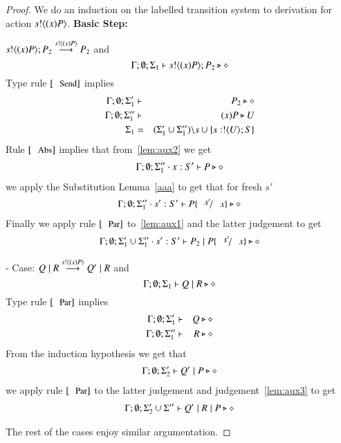 \begin{proof}

	\noi We do an induction on the labelled transition system
	to derivation for action $s ! \langle (x) P \rangle$.
	{\bf Basic Step: }

	\noi $s ! \langle (x) P \rangle ; P_2 \stackrel{s ! \langle (x) P \rangle}{\longrightarrow} P_2$ and
	\[
		\Gamma; \emptyset; \Sigma_1 \vdash s ! \langle (x) P \rangle ; P_2 \triangleright \diamond
	\]
	\noi Type rule $\trule{Send}$ implies
	\begin{eqnarray}
		\Gamma; \emptyset; \Sigma_1' &\vdash& P_2 \triangleright \diamond \label{lem:aux1}\\
		\Gamma; \emptyset; \Sigma_1'' &\vdash& (x) P \triangleright U \label{lem:aux2} \\
		\Sigma_1 &=& (\Sigma_1' \cup \Sigma_1'')\backslash s \cup \{s: ! \langle U \rangle ; S\}
	\end{eqnarray}
	\noi Rule $\trule{Abs}$ implies that from~\ref{lem:aux2} we get
	\begin{eqnarray*}
		\Gamma; \emptyset; \Sigma_1'' \cdot x: S' \vdash P \triangleright \diamond
	\end{eqnarray*}
	\noi we apply the Substitution Lemma~\ref{aaa} to get that for fresh $s'$
	\begin{eqnarray*}
		\Gamma; \emptyset; \Sigma_1'' \cat s': S' \proves P\subst{s'}{x} \hastype \Proc
	\end{eqnarray*}
	\noi Finally we apply rule $\trule{Par}$ to~\ref{lem:aux1} and the latter judgement to get
	\begin{eqnarray*}
		\Gamma; \emptyset; \Sigma_1' \cup \Sigma_1'' \cat s': S' \proves P_2 \Par P\subst{s'}{x} \hastype \Proc
	\end{eqnarray*}


	\noi - Case: $Q \;|\; R \stackrel{s ! \langle (x) P \rangle}{\longrightarrow} Q' \;|\; R$ and
	\[
		\Gamma; \emptyset; \Sigma_1 \vdash Q \;|\; R \triangleright \diamond
	\]
	\noi Type rule $\trule{Par}$ implies
	\begin{eqnarray}
		\Gamma; \emptyset; \Sigma_1' &\vdash& Q \triangleright \diamond\\
		\Gamma; \emptyset; \Sigma_1'' &\vdash& R \triangleright \diamond \label{lem:aux3}
	\end{eqnarray}
	\noi From the induction hypothesis we get that 
	\begin{eqnarray*}
		\Gamma; \emptyset; \Sigma_2' \vdash Q' \;|\; P \triangleright \diamond
	\end{eqnarray*}
	we apply rule $\trule{Par}$ to the latter judgement and judgement~\ref{lem:aux3} to get
	\begin{eqnarray*}
		\Gamma; \emptyset; \Sigma_2' \cup \Sigma'' \vdash Q' \;|\; R \;|\; P \triangleright \diamond
	\end{eqnarray*}

	The rest of the cases enjoy similar argumentation.
\end{proof}

